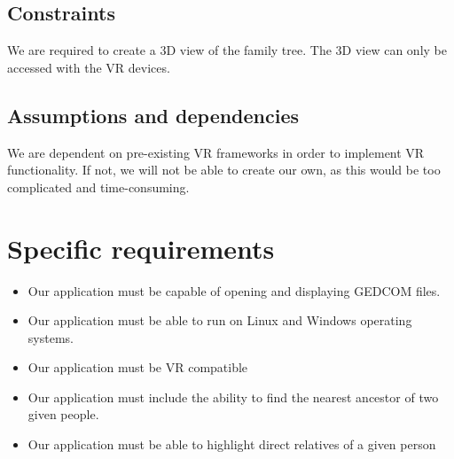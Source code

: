 \documentclass[onecolumn, draftclsnofoot, 10pt, compsoc]{IEEEtran}
\begin{document}
\subsection{Constraints}
\begin{singlespace}
We are required to create a 3D view of the family tree. The 3D view can only be accessed with the VR devices. 
\end{singlespace}

\subsection{Assumptions and dependencies}
\begin{singlespace}
We are dependent on pre-existing VR frameworks in order to implement VR functionality. If not, we will not be able to create our own, as this would be too complicated and time-consuming.
\end{singlespace}

\section{Specific requirements}
\begin{itemize}
\item Our application must be capable of opening and displaying GEDCOM files.
\item Our application must be able to run on Linux and Windows operating systems. 
\item Our application must be VR compatible
\item Our application must include the ability to find the nearest ancestor of two given people.
\item Our application must be able to highlight direct relatives of a given person
\end{itemize}

\appendix
\end{document}
